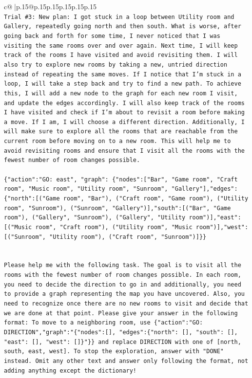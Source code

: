 \documentclass{article}
\begin{document}
{\begin{supertabular}{c@{$\;$}|p{.15\linewidth}@{}p{.15\linewidth}p{.15\linewidth}p{.15\linewidth}p{.15\linewidth}p{.15\linewidth}}
{{{\\ 
\texttt{Trial \#3: New plan: I got stuck in a loop between Utility room and Gallery, repeatedly going north and then south. What is worse, after going back and forth for some time, I never noticed that I was visiting the same rooms over and over again. Next time, I will keep track of the rooms I have visited and avoid revisiting them. I will also try to explore new rooms by taking a new, untried direction instead of repeating the same moves. If I notice that I'm stuck in a loop, I will take a step back and try to find a new path. To achieve this, I will add a new node to the graph for each new room I visit, and update the edges accordingly. I will also keep track of the rooms I have visited and check if I'm about to revisit a room before making a move. If I am, I will choose a different direction. Additionally, I will make sure to explore all the rooms that are reachable from the current room before moving on to a new room. This will help me to avoid revisiting rooms and ensure that I visit all the rooms with the fewest number of room changes possible. } \\
\\ 
\texttt{\{"action":"GO: east", "graph": \{"nodes":{[}"Bar", "Game room", "Craft room", "Music room", "Utility room", "Sunroom", "Gallery"{]},"edges":\{"north":{[}("Game room", "Bar"), ("Craft room", "Game room"), ("Utility room", "Sunroom"), ("Sunroom", "Gallery"){]},"south":{[}("Bar", "Game room"), ("Gallery", "Sunroom"), ("Gallery", "Utility room"){]},"east":{[}("Music room", "Craft room"), ("Utility room", "Music room"){]},"west":{[}("Sunroom", "Utility room"), ("Craft room", "Sunroom"){]}\}\}} \\
\\ 
\\ 
\texttt{Please help me with the following task. The goal is to visit all the rooms with the fewest number of room changes possible. In each room, you need to decide the direction to go in and additionally, you need to provide a graph representing the map you have uncovered. Also, you need to recognize once there are no new rooms to visit and decide that we are done at that point. Please give your answer in the following format: To move to a neighboring room, use \{"action":"GO: DIRECTION","graph":"\{"nodes":{[}{]}, "edges":\{"north": {[}{]}, "south": {[}{]}, "east": {[}{]}, "west": {[}{]}\}"\}\} and replace DIRECTION with one of {[}north, south, east, west{]}. To stop the exploration, answer with "DONE" instead. Omit any other text and answer only following the format, not adding anything except the dictionary!} \\
}}}
\end{supertabular}}
\end{document}
